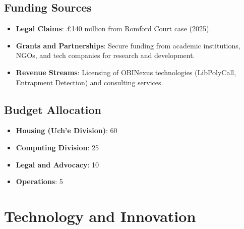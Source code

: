 \documentclass[12pt]{article}\usepackage[a4paper,margin=1in]{geometry}
\begin{document}
\subsection*{Funding Sources}
\begin{itemize}
    \item \textbf{Legal Claims}: £140 million from Romford Court case (2025).
    \item \textbf{Grants and Partnerships}: Secure funding from academic institutions, NGOs, and tech companies for research and development.
    \item \textbf{Revenue Streams}: Licensing of OBINexus technologies (LibPolyCall, Entrapment Detection) and consulting services.
\end{itemize}\subsection*{Budget Allocation}
\begin{itemize}
    \item \textbf{Housing (Uch'e Division)}: 60%
    \item \textbf{Computing Division}: 25%
    \item \textbf{Legal and Advocacy}: 10%
    \item \textbf{Operations}: 5%
\end{itemize}\section*{Technology and Innovation}
\end{document}
